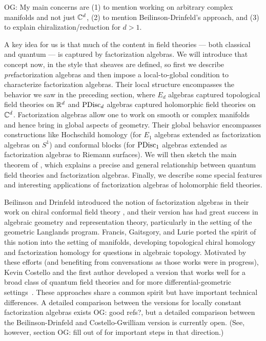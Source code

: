 \documentclass[11pt]{amsart}
\def\owen#1{{\textcolor{violet!50!black}{OG: {#1}}}}
\begin{document}
\owen{My main concerns are (1) to mention working on arbitrary complex manifolds and not just $\mathbb C^d$, (2) to mention Beilinson-Drinfeld's approach, and (3) to explain chiralization/reduction for $d > 1$.}

A key idea for us is that much of the content in field theories --- both classical and quantum --- is captured by factorization algebras.
We will introduce that concept now, in the style that sheaves are defined, so first we describe {\em pre}\/factorization algebras and then impose a local-to-global condition to characterize factorization algebras.
Their local structure encompasses the behavior we saw in the preceding section, where $E_d$ algebras captured topological field theories on $\mathbb R^d$ and ${\rm PDisc}_d$ algebras captured holomorphic field theories on~$\mathbb C^d$.
Factorization algebras allow one to work on smooth or complex manifolds and hence bring in global aspects of geometry.
Their global behavior encompasses constructions like Hochschild homology (for $E_1$ algebras extended as factorization algebras on $S^1$) and conformal blocks (for ${\rm PDisc}_1$ algebras extended as factorization algebras to Riemann surfaces).
We will then sketch the main theorem of \cite{CG2}, 
which explains a precise and general relationship between quantum field theories and factorization algebras.
Finally, we describe some special features and interesting applications of factorization algebras of holomorphic field theories.

\begin{rmk}
Beilinson and Drinfeld introduced the notion of factorization algebras in their work on chiral conformal field theory \cite{BD},
and their version has had great success in algebraic geometry and representation theory,
particularly in the setting of the geometric Langlands program.
Francis, Gaitsgory, and Lurie ported the spirit of this notion into the setting of manifolds,
developing topological chiral homology \cite{LurieHA} and factorization homology \cite{AF}
for questions in algebraic topology.
Motivated by these efforts (and benefiting from conversations as those works were in progress), 
Kevin Costello and the first author developed a version that works well for a broad class of quantum field theories and for more differential-geometric settings~\cite{CG1,CG2}.
These approaches share a common spirit but have important technical differences.
A detailed comparison between the versions for locally constant factorization algebras exists \owen{good refs?},
but a detailed comparison between the Beilinson-Drinfeld and Costello-Gwilliam version is currently open.
(See, however, section \owen{fill out } of \cite{HenKap} for important steps in that direction.)
\end{rmk}
\end{document}
